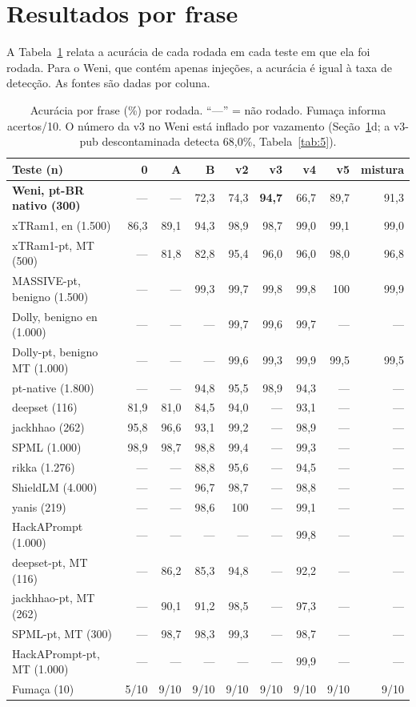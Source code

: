 \documentclass[11pt]{article}
\begin{document}
\section{Resultados por frase}\label{sec:4}

A Tabela~\ref{tab:4} relata a acurácia de cada rodada em cada teste em que ela foi rodada. Para o Weni, que contém apenas injeções, a acurácia é igual à taxa de detecção. As fontes são dadas por coluna.

\begin{table}[tbp]
\centering
\small
\caption{Acurácia por frase (\%) por rodada. ``—'' = não rodado. Fumaça informa acertos/10. O número da v3 no Weni está inflado por vazamento (Seção~\ref{sec:4}d; a v3-pub descontaminada detecta 68,0\%, Tabela~\ref{tab:5}).}\label{tab:4}
\begin{tabular}{@{}lrrrrrrrr@{}}
\toprule
Teste (n) & 0 %
 & A %
 & B %
 & v2 %
 & v3 %
 & v4 %
 & v5 %
 & mistura %
 \\
\midrule
\textbf{Weni, pt-BR nativo (300)} & — & — & 72,3 & 74,3 & \textbf{94,7} & 66,7 & 89,7 & 91,3 \\
xTRam1, en (1.500) & 86,3 & 89,1 & 94,3 & 98,9 & 98,7 & 99,0 & 99,1 & 99,0 \\
xTRam1-pt, MT (500) & — & 81,8 & 82,8 & 95,4 & 96,0 & 96,0 & 98,0 & 96,8 \\
MASSIVE-pt, benigno (1.500) & — & — & 99,3 & 99,7 & 99,8 & 99,8 & 100 & 99,9 \\
Dolly, benigno en (1.000) & — & — & — & 99,7 & 99,6 & 99,7 & — & — \\
Dolly-pt, benigno MT (1.000) & — & — & — & 99,6 & 99,3 & 99,9 & 99,5 & 99,5 \\
pt-native (1.800) & — & — & 94,8 & 95,5 & 98,9 & 94,3 & — & — \\
deepset (116) & 81,9 & 81,0 & 84,5 & 94,0 & — & 93,1 & — & — \\
jackhhao (262) & 95,8 & 96,6 & 93,1 & 99,2 & — & 98,9 & — & — \\
SPML (1.000) & 98,9 & 98,7 & 98,8 & 99,4 & — & 99,3 & — & — \\
rikka (1.276) & — & — & 88,8 & 95,6 & — & 94,5 & — & — \\
ShieldLM (4.000) & — & — & 96,7 & 98,7 & — & 98,8 & — & — \\
yanis (219) & — & — & 98,6 & 100 & — & 99,1 & — & — \\
HackAPrompt (1.000) & — & — & — & — & — & 99,8 & — & — \\
deepset-pt, MT (116) & — & 86,2 & 85,3 & 94,8 & — & 92,2 & — & — \\
jackhhao-pt, MT (262) & — & 90,1 & 91,2 & 98,5 & — & 97,3 & — & — \\
SPML-pt, MT (300) & — & 98,7 & 98,3 & 99,3 & — & 98,7 & — & — \\
HackAPrompt-pt, MT (1.000) & — & — & — & — & — & 99,9 & — & — \\
Fumaça (10) & 5/10 & 9/10 & 9/10 & 9/10 & 9/10 & 9/10 & 9/10 & 9/10 \\
\bottomrule
\end{tabular}
\end{table}
\end{document}
